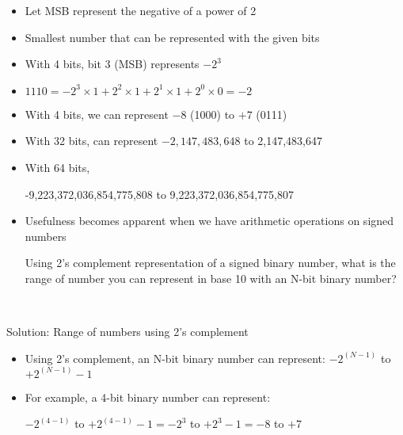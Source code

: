\begin{frame}[fragile]
\begin{itemize}
\item Let MSB represent the negative of a power of 2 
\item Smallest number that can be represented with the given bits
\item With 4 bits, bit 3 (MSB) represents $-2^3$
\item $1110 = -2^3 \times 1 + 2^2 \times 1 + 2^1 \times 1 + 2^0 \times 0 = -2$
\item With 4 bits, we can represent $-8$ (1000) to $+7$ (0111)
\item With 32 bits, can represent $-2,147,483,648$ to 2,147,483,647
\item With 64 bits,

  -9,223,372,036,854,775,808 to 9,223,372,036,854,775,807
\item Usefulness becomes apparent when we have arithmetic operations on signed numbers
\begin{tcolorbox}[enhanced,attach boxed title to top center={yshift=-3mm,yshifttext=-1mm},
  colback=blue!5!white,colframe=blue!75!black,colbacktitle=blue!80!black,
  title=Think About It,fonttitle=\bfseries,
  boxed title style={size=small,colframe=red!50!black} ]
  Using 2's complement representation of a signed binary number, what is the range of number you can represent in base 10 with an N-bit binary number?
  \end{tcolorbox}
\end{itemize}
\BNotes\ifnum{}
~%
\fi\ENotes
\end{frame}

\ifnum{}
\begin{frame}{Solution: Range of numbers using 2's complement}

\begin{itemize}
    \item Using 2's complement, an N-bit binary number can represent:
$-2^{(N-1)}$ to $ +2^{(N-1)} - 1$
\item For example, a 4-bit binary number can represent:

$-2^{(4-1)}$ to $+2^{(4-1)} - 1 = -2^3 $ to $+2^3 - 1 = -8$ to $+ 7$
\end{itemize}
    
\end{frame}
\fi

